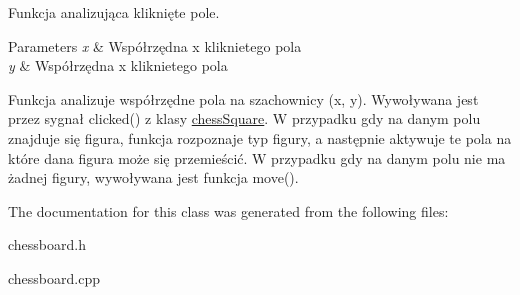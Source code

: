Funkcja analizująca kliknięte pole. 


\begin{DoxyParams}{Parameters}
{\em x} & Współrzędna x kliknietego pola \\
\hline
{\em y} & Współrzędna x kliknietego pola\\
\hline
\end{DoxyParams}
Funkcja analizuje współrzędne pola na szachownicy (x, y). Wywoływana jest przez sygnał clicked() z klasy \hyperlink{classchess_square}{chess\+Square}. W przypadku gdy na danym polu znajduje się figura, funkcja rozpoznaje typ figury, a następnie aktywuje te pola na które dana figura może się przemieścić. W przypadku gdy na danym polu nie ma żadnej figury, wywoływana jest funkcja move(). 

The documentation for this class was generated from the following files\+:\begin{DoxyCompactItemize}
\item 
chessboard.\+h\item 
chessboard.\+cpp\end{DoxyCompactItemize}

